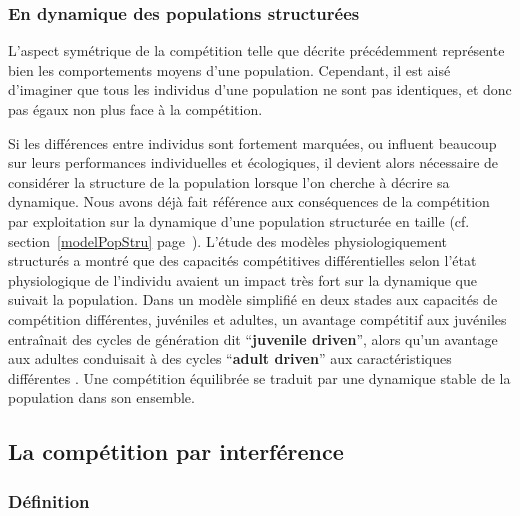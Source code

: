\subsubsection{En dynamique des populations structurées}

L'aspect symétrique de la compétition telle que décrite précédemment représente
bien les comportements moyens d'une population. Cependant, il est aisé
d'imaginer que tous les individus d'une population ne sont pas identiques, et
donc pas égaux non plus face à la compétition. 

Si les différences entre individus sont fortement marquées, ou influent
beaucoup sur leurs performances individuelles et écologiques, il devient alors
nécessaire de considérer la structure de la population lorsque l'on cherche à
décrire sa dynamique. Nous avons déjà fait référence aux conséquences de la
compétition par exploitation sur la dynamique d'une population structurée en
taille (cf. section~\ref{modelPopStru} page~\pageref{modelPopStru}). L'étude
des modèles physiologiquement structurés a montré que des capacités compétitives différentielles selon l'état
physiologique de l'individu avaient un impact très fort sur la dynamique que
suivait la population. Dans un modèle simplifié en deux stades aux capacités de
compétition différentes, juvéniles et adultes, un avantage compétitif aux
juvéniles entraînait des cycles de génération dit ``\textbf{juvenile driven}'',
alors qu'un avantage aux adultes conduisait à des cycles ``\textbf{adult
driven}'' aux caractéristiques différentes \autocites{de-roos2003a}. Une
compétition équilibrée se traduit par une dynamique stable de la population dans son ensemble. 


\subsection{La compétition par interférence}

\subsubsection{Définition}

